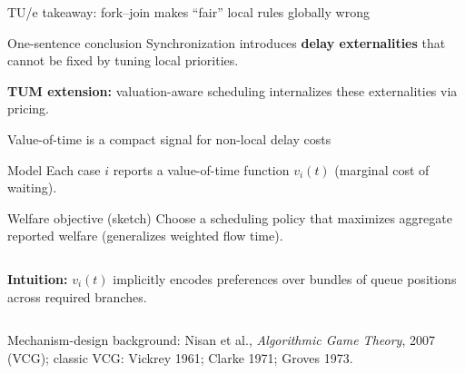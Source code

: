 \documentclass[aspectratio=169,10pt]{beamer}
\newif\iflong
\newcommand{\btext}[1]{\textbf{\color{darkred}#1}}
\newcommand{\smallref}[1]{{\scriptsize\color{darkgray}#1}}
\begin{document}
\iflong\else
\begin{frame}{TU/e takeaway: fork--join makes ``fair'' local rules globally wrong}
  \begin{block}{One-sentence conclusion}
    Synchronization introduces \btext{delay externalities} that cannot be fixed by tuning local priorities.
  \end{block}
  \vspace{0.15cm}
  \btext{TUM extension:} valuation-aware scheduling internalizes these externalities via pricing.
\end{frame}
\fi

\iflong
\begin{frame}{Value-of-time is a compact signal for non-local delay costs}
  \begin{block}{Model}
    Each case \(i\) reports a value-of-time function \(v_i(t)\) (marginal cost of waiting).
  \end{block}
  \vspace{0.1cm}
  \begin{block}{Welfare objective (sketch)}
    Choose a scheduling policy that maximizes aggregate reported welfare (generalizes weighted flow time).
  \end{block}
  \vspace{0.15cm}
  \begin{columns}[T]
      \btext{Intuition:} \(v_i(t)\) implicitly encodes preferences over bundles of queue positions across required branches.
      \centering
  \end{columns}
  \smallref{Mechanism-design background: Nisan et al., \emph{Algorithmic Game Theory}, 2007 (VCG); classic VCG: Vickrey 1961; Clarke 1971; Groves 1973.}
\end{frame}
\end{document}
